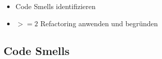 \begin{itemize}
	\item Code Smells identifizieren
	\item $>= 2$ Refactoring anwenden und begründen
\end{itemize}
\subsection{Code Smells}